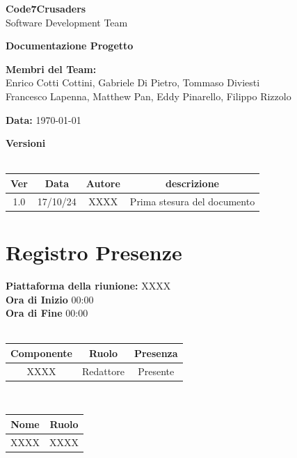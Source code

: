 \documentclass{article}
\begin{document}
\begin{titlepage}
    {\Huge \textbf{Code7Crusaders}}\\
    \vspace{0.5cm}
    {\Large Software Development Team}\\
    \vspace{2cm}
    
    {\large \textbf{Documentazione Progetto}}\\
    \vspace{5cm}

    \textbf{Membri del Team:}\\
    Enrico Cotti Cottini, Gabriele Di Pietro, Tommaso Diviesti \\
    Francesco Lapenna, Matthew Pan, Eddy Pinarello, Filippo Rizzolo \\
    \vspace{0.5cm}
    
    {\large \textbf{Data:}} \today\\
    
    \vspace{1cm}
\end{titlepage}

\newpage
\begin{center}
    \textbf{Versioni}
    \\
    \\
    \begin{tabular}{|c|c|c|c|}
        \hline
        \textbf{Ver} & \textbf{Data} & \textbf{Autore} & \textbf{descrizione}\\
        \hline
        1.0 & 17/10/24 & XXXX & Prima stesura del documento \\
        \hline
    \end{tabular}
\end{center}
\newpage
\section{Registro Presenze}
\textbf{Piattaforma della riunione:} XXXX \\
\textbf{Ora di Inizio} 00:00\\
\textbf{Ora di Fine} 00:00\\
\\
\begin{tabular}{|c|c|c|}
    \hline
    \textbf{Componente} & \textbf{Ruolo} & \textbf{Presenza}\\
    \hline
    XXXX & Redattore & Presente \\ %
    \hline %
\end{tabular}
\\
\begin{tabular}{|c|c|}
    \hline
    \textbf{Nome} & \textbf{Ruolo}\\
    \hline
    XXXX & XXXX\\
    \hline
\end{tabular}
\newpage
\end{document}
